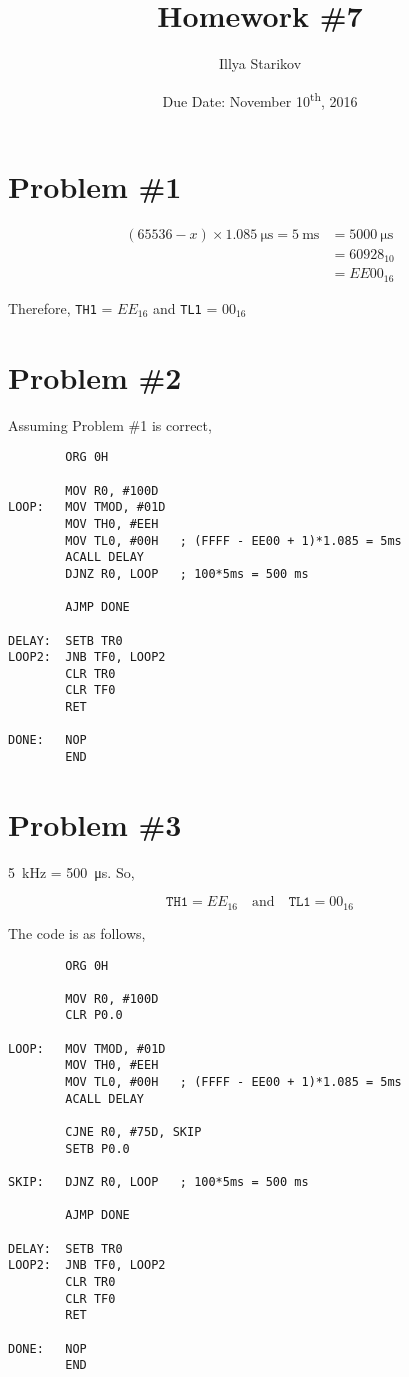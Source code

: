 \documentclass[12pt]{article}
\title{Homework \#7}
\date{Due Date: November 10\textsuperscript{th}, 2016}
\author{Illya Starikov}
\begin{document}
\maketitle

\section{Problem \#1}
\begin{align}
    (65536 - x) \times \SI{1.085}{\micro\second} = \SI{5}{\milli\second} &= \SI{5000}{\micro\second} \\
    &= 60928_{10} \\
    &= EE00_{16}
\end{align}

Therefore, \texttt{TH1} = $EE_{16}$ and \texttt{TL1} = $00_{16}$

\section{Problem \#2}
Assuming Problem \#1 is correct,

\begin{verbatim}
        ORG 0H

        MOV R0, #100D
LOOP:   MOV TMOD, #01D
        MOV TH0, #EEH
        MOV TL0, #00H   ; (FFFF - EE00 + 1)*1.085 = 5ms
        ACALL DELAY
        DJNZ R0, LOOP   ; 100*5ms = 500 ms

        AJMP DONE

DELAY:  SETB TR0
LOOP2:  JNB TF0, LOOP2
        CLR TR0
        CLR TF0
        RET

DONE:   NOP
        END
\end{verbatim}

\section{Problem \#3}
\SI{5}{\kilo\hertz} = \SI{500}{\micro\second}. So,

\begin{equation}
    \mathtt{TH1} = EE_{16} \quad\text{and}\quad \mathtt{TL1} = 00_{16}
\end{equation}

\noindent The code is as follows,

\begin{verbatim}
        ORG 0H

        MOV R0, #100D
        CLR P0.0

LOOP:   MOV TMOD, #01D
        MOV TH0, #EEH
        MOV TL0, #00H   ; (FFFF - EE00 + 1)*1.085 = 5ms
        ACALL DELAY

        CJNE R0, #75D, SKIP
        SETB P0.0

SKIP:   DJNZ R0, LOOP   ; 100*5ms = 500 ms

        AJMP DONE

DELAY:  SETB TR0
LOOP2:  JNB TF0, LOOP2
        CLR TR0
        CLR TF0
        RET

DONE:   NOP
        END
\end{verbatim}
\end{document}

